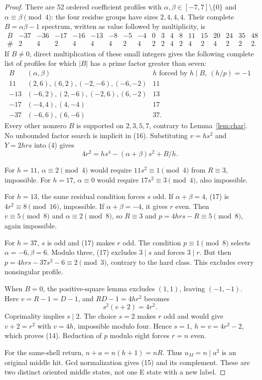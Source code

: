 \begin{proof}
There are 52 ordered coefficient profiles with $\alpha,\beta\in[-7,7]\setminus\{0\}$
and $\alpha\equiv\beta\pmod4$: the four residue groups have sizes $2,4,4,4$.
Their complete $B=\alpha\beta-1$ spectrum, written as value followed by
multiplicity, is
\[
\begin{array}{c|rrrrrrrrrrrrrrrrrr}
B&-37&-36&-17&-16&-13&-8&-5&-4&0&3&4&8&11&15&20&24&35&48\\
\#&2&4&2&4&4&4&2&4&2&2&4&2&4&2&4&2&2&2.
\end{array}
\]
If $B\ne0$, direct multiplication of these small integers gives the following
complete list of profiles for which $|B|$ has a prime factor greater than seven:
\[
\begin{array}{c|c|c}
 B& (\alpha,\beta)&h\text{ forced by }h\mid B,\ (h/p)=-1\\ \hline
 11&(2,6),(6,2),(-2,-6),(-6,-2)&11\\
 -13&(-6,2),(2,-6),(-2,6),(6,-2)&13\\
 -17&(-4,4),(4,-4)&17\\
 -37&(-6,6),(6,-6)&37.
\end{array}                                             \tag{16}
\]
Every other nonzero $B$ is supported on $2,3,5,7$, contrary to
Lemma~\ref{lem:char}. No unbounded factor search is implicit in (16).
Substituting $v=hs^2$ and $Y=2hrs$ into (4) gives
\[
 \boxed{4r^2=hs^4-(\alpha+\beta)s^2+B/h.}                \tag{17}
\]

For $h=11$, $\alpha\equiv2\pmod4$ would require $11s^2\equiv1\pmod4$ from
$R\equiv3$, impossible. For $h=17$, $\alpha\equiv0$ would require
$17s^2\equiv3\pmod4$, also impossible.

For $h=13$, the same residual condition forces $s$ odd. If $\alpha+\beta=4$,
(17) is $4r^2\equiv8\pmod{16}$, impossible. If $\alpha+\beta=-4$, it gives
$r$ even. Then $v\equiv5\pmod8$ and $\alpha\equiv2\pmod8$, so $R\equiv3$
and $p=4hrs-R\equiv5\pmod8$, again impossible.

For $h=37$, $s$ is odd and (17) makes $r$ odd. The condition $p\equiv1\pmod8$
selects $\alpha=-6,\beta=6$. Modulo three, (17) excludes $3\mid s$ and forces
$3\mid r$. But then $p=4hrs-37s^2-6\equiv2\pmod3$, contrary to the hard class.
This excludes every nonsingular profile.

When $B=0$, the positive-square lemma excludes $(1,1)$, leaving $(-1,-1)$.
Here $v=R-1=D-1$, and $RD-1=4hr^2$ becomes
\[
 s^2(v+2)=4r^2.
\]
Coprimality implies $s\mid2$. The choice $s=2$ makes $r$ odd and would give
$v+2=r^2$ with $v=4h$, impossible modulo four. Hence $s=1$, $h=v=4r^2-2$,
which proves (14). Reduction of $p$ modulo eight forces $r=n$ even.

For the same-shell return, $n+a=n(h+1)=nR$. Thus $u_M=n\mid a^2$ is an
original middle hit. Gcd normalization gives (15) and its complement. These
are two distinct oriented middle states, not one E state with a new label.
\end{proof}

